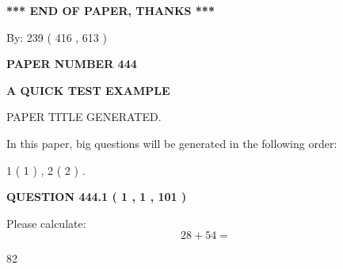 \documentclass[12pt]{article}
\begin{document}
   
   
   
\vspace{1.0in} 
{\textbf{\large{ *** END OF PAPER, THANKS *** }}} 
   
   
\hspace{1.0in} By: 
 239 ( 416 ,  613 )
   
   
   
   
\newpage 
\setcounter{page}{ 
   444001 } 
   
   
   
   
 {\textbf{ \Large{ PAPER NUMBER  444  }}}
   
   
\vspace{0.2in}
   
   
   
   
   
   
   
   
 \vspace{0.2in}
{\LARGE {\textbf{ A QUICK TEST EXAMPLE}}}
   
   
 PAPER TITLE GENERATED.
   
   
   
\vspace{0.2in}
   
In this paper, big questions will be generated in the following order: 
   
   
   1 ( 1 )
 ,
   2 ( 2 )
 .
  
\vspace{0.2in}
  
{\textbf{\Large{QUESTION
444.1 
 ( 1 , 1 , 101 )
}}}
  
  
 
Please calculate:
\begin{equation}
28 +  %
54 = \nonumber
\end{equation}
 
 
 
\noindent{}
 
 

82
 
 
\noindent{}
 
 

 
 
 
\noindent{}
 
\end{document}
